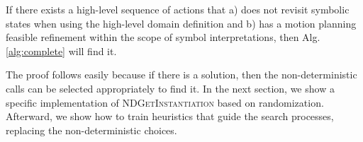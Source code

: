 \begin{thm}
If there exists a high-level sequence of actions that 
a) does not revisit symbolic states when using the high-level domain
definition and b) has a motion planning feasible refinement within the scope
of symbol interpretations, then Alg.\,\ref{alg:complete} will find it. 
\end{thm}

The proof follows easily because if there is a solution, then
the non-deterministic calls can be selected appropriately to find
it. In the next section, we show a specific implementation of \textsc{NDGetInstantiation}
based on randomization. Afterward, we show how to train
heuristics that guide the search processes, replacing the non-deterministic choices.



